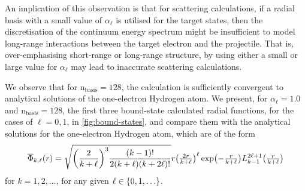\documentclass[]{article}
\begin{document}
An implication of this observation is that for scattering calculations, if a
radial basis with a small value of $\alpha_{\ell}$ is utilised for the target
states, then the discretisation of the continuum energy spectrum might be
insufficient to model long-range interactions between the target electron and
the projectile.
That is, over-emphasising short-range or long-range structure, by using either a
small or large value for $\alpha_{\ell}$ may lead to inaccurate scattering
calculations.


We observe that for $\mathrm{n_{basis}} = 128$, the calculation is sufficiently
convergent to analytical solutions of the one-electron Hydrogen atom.
We present, for $\alpha_{\ell} = 1.0$ and $\mathrm{n_{basis}} = 128$, the first
three bound-state calculated radial functions, for the cases of $\ell = 0, 1$,
in \autoref{fig:bound-states}, and compare them with the analytical solutions
for the one-electron Hydrogen atom, which are of the form
\begin{equation*}
  \overline{\Phi}_{k, \ell}\lr{r}
  =
  \sqrt
  {
    \lr[\bigg]
    {
      \dfrac
      {
        2
      }
      {
        k
        +
        \ell
      }
    }^{3}
    \dfrac
    {
      \lr{k - 1}!
    }
    {
      2
      \lr{k + \ell}
      \lr{k + 2\ell}!
    }
  }
  r
  \lr[\big]
  {
    \tfrac
    {
      2
      r
    }
    {
      k
      +
      \ell
    }
  }^{\ell}
  \exponential\lr[\big]
  {
    -
    \tfrac
    {
      r
    }
    {
      k
      +
      \ell
    }
  }
  L_{k - 1}^{2\ell + 1}\lr[\big]
  {
    \tfrac
    {
      r
    }
    {
      k
      +
      \ell
    }
  }
\end{equation*}
for $k = 1, 2, \dotsc$, for any given $\ell \in \lrset{0, 1, \dotsc}$.
\end{document}
